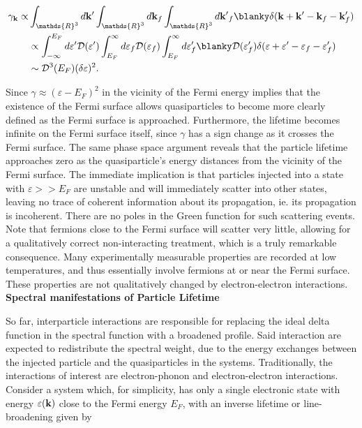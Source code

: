 \begin{equation} \begin{split}
    \gamma_{\bf k} \propto & \int_{\mathds{R}^3} d{\bf k'} \int_{\mathds{R}^3} d{\bf k}_{f} \int_{\mathds{R}^3} d{\bf k'}_{f} \blanky \delta({\bf k} + {\bf k'} - {\bf k}_f - {\bf k}'_{f}) \\
    & \propto \int_{-\infty}^{E_F} d \varepsilon' \mathcal{D}(\varepsilon') \int_{E_F}^{\infty} d\varepsilon_{f} \mathcal{D}(\varepsilon_f) \int_{E_F}^{\infty} d\varepsilon'_{f}  \blanky \mathcal{D}(\varepsilon'_f) \delta(\varepsilon + \varepsilon' - \varepsilon_f - \varepsilon'_f) \\
    & \sim \mathcal{D}^{3}(E_F) (\delta \varepsilon)^2.
\end{split}
\end{equation}

Since $\gamma \approx (\varepsilon - E_F)^2$ in the vicinity of the Fermi energy implies that the existence of the Fermi surface allows quasiparticles to become more clearly defined as the Fermi surface is approached. Furthermore, the lifetime becomes infinite on the Fermi surface itself, since $\gamma$ has a sign change as it crosses the Fermi surface. The same phase space argument reveals that the particle lifetime approaches zero as the quasiparticle's energy distances from the vicinity of the Fermi surface. The immediate implication is that particles injected into a state with $\varepsilon >> E_F$ are unstable and will immediately scatter into other states, leaving no trace of coherent information about its propagation, ie. its propagation is incoherent. There are no poles in the Green function for such scattering events. Note that fermions close to the Fermi surface will scatter very little, allowing for a qualitatively correct non-interacting treatment, which is a truly remarkable consequence. Many experimentally measurable properties are recorded at low temperatures, and thus essentially involve fermions at or near the Fermi surface. These properties are not qualitatively changed by electron-electron interactions. \\

\textbf{Spectral manifestations of Particle Lifetime}

So far, interparticle interactions are responsible for replacing the ideal delta function in the spectral function with a broadened profile. Said interaction are expected to redistribute the spectral weight, due to the energy exchanges between the injected particle and the quasiparticles in the systems. Traditionally, the interactions of interest are electron-phonon and electron-electron interactions. Consider a system which, for simplicity, has only a single electronic state with energy $\varepsilon({\bf k})$ close to the Fermi energy $E_F$, with an inverse lifetime or line-broadening given by 

